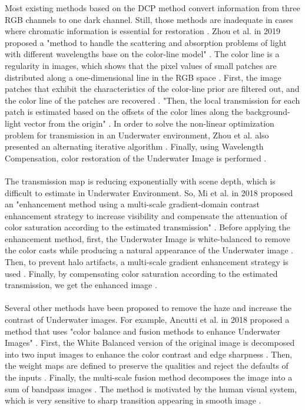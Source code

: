 \documentclass[a4paper,11pt,oneside]{article}
\begin{document}
   Most existing methods based on the DCP method convert information from three RGB channels to one dark channel. Still, those methods are inadequate in cases where chromatic information is essential for restoration \cite{17}. Zhou et al. in 2019 \cite{17} proposed a "method to handle the scattering and absorption problems of light with different wavelengths base on the color-line model" \cite{17}. The color line is a regularity in images, which shows that the pixel values of small patches are distributed along a  one-dimensional line in the RGB space \cite{17}. First, the image patches that exhibit the characteristics of the color-line prior are filtered out, and the color line of the patches are recovered \cite{17}. "Then, the local transmission for each patch is estimated based on the offsets of the color lines along the background-light vector from the origin" \cite{17}. In order to solve the non-linear optimization problem for transmission in an Underwater environment, Zhou et al. also presented an alternating iterative algorithm \cite{17}. Finally, using Wavelength Compensation, color restoration of the Underwater Image is performed \cite{17}.\\
  \\
  The transmission map is reducing exponentially with scene depth, which is difficult to estimate in Underwater Environment. So, Mi et al. in 2018 \cite{11} proposed an "enhancement method using a multi-scale gradient-domain contrast enhancement strategy to increase visibility and compensate the attenuation of color saturation according to the estimated transmission" \cite{11}. Before applying the enhancement method, first, the Underwater Image is white-balanced to remove the color casts while producing a natural appearance of the Underwater image \cite{11}. Then, to prevent halo artifacts, a multi-scale gradient enhancement strategy is used \cite{11}. Finally, by compensating color saturation according to the estimated transmission, we get the enhanced image \cite{11}.\\ 
  \\
  Several other methods have been proposed to remove the haze and increase the contrast of Underwater images. For example, Ancutti et al. in 2018 \cite{16} proposed a method that uses "color balance and fusion methods to enhance Underwater Images" \cite{16}. First, the White Balanced version of the original image is decomposed into two input images to enhance the color contrast and edge sharpness \cite{16}. Then, the weight maps are defined to preserve the qualities and reject the defaults of the inputs \cite{16}. Finally, the multi-scale fusion method decomposes the image into a sum of bandpass images \cite{16}. The method is motivated by the human visual system, which is very sensitive to sharp transition appearing in smooth image \cite{16}.\\
\end{document}
